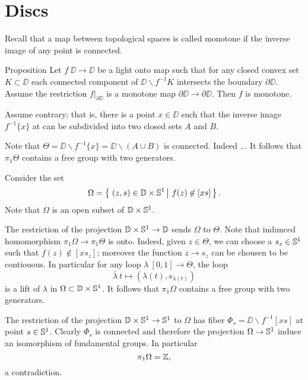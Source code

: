 \section{Discs}

Recall that a map between topological spaces is called monotone if the inverse image of any point is connected.

\begin{thm}{Proposition}
Let $f\:\DD\to \DD$ be a light onto map such that for any closed convex set $K\subset \DD$
each connected component of $\DD\backslash f^{-1}K$ intersects the boundary $\partial \DD$.
Assume the restriction $f|_{\partial \DD}$ is a monotone map $\partial\DD\to \partial\DD$.
Then $f$ is monotone.
\end{thm}

Assume contrary;
that is, there is a point $x\in \DD$ such that the inverse image $f^{-1}\{x\}$ at can be subdivided into two closed sets $A$ and $B$.

Note that $\Theta=\DD\backslash f^{-1}\{x\}=\DD\backslash (A\cup B)$ is connected.
Indeed ...
It follows that $\pi_1\Theta$ contains a free group with two generators.

Consider the set
\[\Omega=\set{(z,s)\in \DD\times\SS^1}{f(z)\not\in [xs]}.\]
Note that $\Omega$ is an open subset of $\mathbb{D}\times\mathbb{S}^1$.

The restriction of the projection $\mathbb{D}\times\mathbb{S}^1\to \mathbb{D}$ sends $\Omega$ to $\Theta$.
Note that indunced homomorphism $\pi_1\Omega\to \pi_1\Theta$ is onto.
Indeed, given $z\in \Theta$, we can choose a $s_z\in\mathbb{S}^1$ such that 
$f(z)\notin [xs_z]$;
moreover the function $z\to s_z$ can be chousen to be contiouous.
In particular for any loop $\lambda\:[0,1]\to\Theta$, the loop 
\[\bar\lambda\:t\mapsto (\lambda(t),s_{\lambda(t)})\]
is a lift of $\lambda$ in $\Omega\subset \mathbb{D}\times\mathbb{S}^1$.
It follows that $\pi_1\Omega$ contains a free group with two generators.

The restriction of the projection $\mathbb{D}\times\mathbb{S}^1\to \mathbb{S}^1$ to $\Omega$ has fiber 
$\Phi_s=\DD\backslash f^{-1}[xs]$ at point $s\in\mathbb{S}^1$.
Clearly $\Phi_s$ is connected and therefore the projection $\Omega\to \mathbb{S}^1$ induce an isomorphism of fundamental groups.
In particular 
\[\pi_1\Omega=\mathbb{Z},\]
a contradiction. \qeds

